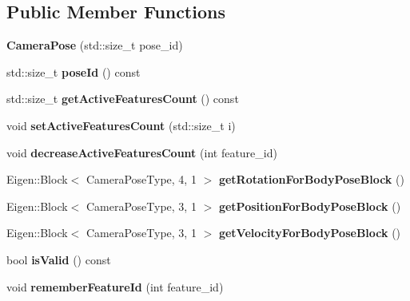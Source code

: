\subsection*{Public Member Functions}
\begin{DoxyCompactItemize}
\item 
\hypertarget{class_camera_pose_a9393e875cfde4b1587a5f8b06d498466}{{\bfseries Camera\-Pose} (std\-::size\-\_\-t pose\-\_\-id)}\label{class_camera_pose_a9393e875cfde4b1587a5f8b06d498466}

\item 
\hypertarget{class_camera_pose_a91fe393ed7bd9c638198a7e138e3926c}{std\-::size\-\_\-t {\bfseries pose\-Id} () const }\label{class_camera_pose_a91fe393ed7bd9c638198a7e138e3926c}

\item 
\hypertarget{class_camera_pose_ab690a1975e061c75e2431c2f671d5637}{std\-::size\-\_\-t {\bfseries get\-Active\-Features\-Count} () const }\label{class_camera_pose_ab690a1975e061c75e2431c2f671d5637}

\item 
\hypertarget{class_camera_pose_ad52f534b1a0b4841a4c8d5e04471f0a1}{void {\bfseries set\-Active\-Features\-Count} (std\-::size\-\_\-t i)}\label{class_camera_pose_ad52f534b1a0b4841a4c8d5e04471f0a1}

\item 
\hypertarget{class_camera_pose_a44b30ca00553c6f0fbebc4410e40e074}{void {\bfseries decrease\-Active\-Features\-Count} (int feature\-\_\-id)}\label{class_camera_pose_a44b30ca00553c6f0fbebc4410e40e074}

\item 
\hypertarget{class_camera_pose_adeec70b16372d5aede066da2b6bf5d4a}{Eigen\-::\-Block$<$ Camera\-Pose\-Type, 4, 1 $>$ {\bfseries get\-Rotation\-For\-Body\-Pose\-Block} ()}\label{class_camera_pose_adeec70b16372d5aede066da2b6bf5d4a}

\item 
\hypertarget{class_camera_pose_af518728cc70c31460a20fc0f6f3f40a4}{Eigen\-::\-Block$<$ Camera\-Pose\-Type, 3, 1 $>$ {\bfseries get\-Position\-For\-Body\-Pose\-Block} ()}\label{class_camera_pose_af518728cc70c31460a20fc0f6f3f40a4}

\item 
\hypertarget{class_camera_pose_ae15933c2b5176d011135164962639a99}{Eigen\-::\-Block$<$ Camera\-Pose\-Type, 3, 1 $>$ {\bfseries get\-Velocity\-For\-Body\-Pose\-Block} ()}\label{class_camera_pose_ae15933c2b5176d011135164962639a99}

\item 
\hypertarget{class_camera_pose_aea5ef3206eb4f8929495dfc8f3a93571}{bool {\bfseries is\-Valid} () const }\label{class_camera_pose_aea5ef3206eb4f8929495dfc8f3a93571}

\item 
\hypertarget{class_camera_pose_a0f61bc8b640a1cba046dc2c1b5cc93d5}{void {\bfseries remember\-Feature\-Id} (int feature\-\_\-id)}\label{class_camera_pose_a0f61bc8b640a1cba046dc2c1b5cc93d5}

\end{DoxyCompactItemize}


